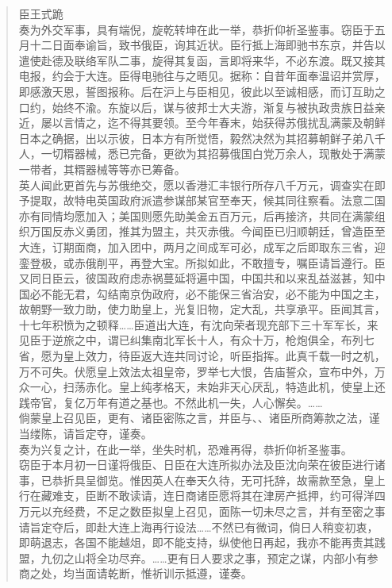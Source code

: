 \begin{quote}
	臣王式跪\\

奏为外交军事，具有端倪，旋乾转坤在此一举，恭折仰祈圣鉴事。窃臣于五月十二日面奉谕旨，致书俄臣，询其近状。臣行抵上海即驰书东京，并告以遣使赴德及联络军队二事，旋得其复函，言即将来华，不必东渡。既又接其电报，约会于大连。臣得电驰往与之晤见。据称：自昔年面奉温诏并赏厚，即感激天恩，誓图报称。后在沪上与臣相见，彼此以至诚相感，而订互助之口约，始终不渝。东旋以后，谋与彼邦士大夫游，渐复与被执政贵族日益亲近，屡以言情之，迄不得其要领。至今年春末，始获得苏俄扰乱满蒙及朝鲜日本之确据，出以示彼，日本方有所觉悟，毅然决然为其招募朝鲜子弟八千人，一切糈器械，悉已完备，更欲为其招募俄国白党万余人，现散处于满蒙一带者，其糈器械等等亦已筹备。\\

英人闻此更首先与苏俄绝交，愿以香港汇丰银行所存八千万元，调查实在即予提取，故特电英国政府派遣参谋部某官至奉天，候其同往察看。法意二国亦有同情均愿加入；美国则愿先助美金五百万元，后再接济，共同在满蒙组织万国反赤义勇团，推其为盟主，共灭赤俄。今闻臣已归顺朝廷，曾造臣至大连，订期面商，加入团中，两月之间成军可必，成军之后即取东三省，迎銮登极，或赤俄削平，再登大宝。所拟如此，不敢擅专，嘱臣请旨遵行。臣又同日臣云，彼国政府虑赤祸蔓延将遍中国，中国共和以来乱益滋甚，知中国必不能无君，勾结南京伪政府，必不能保三省治安，必不能为中国之主，故朝野一致力助，使力助皇上，光复旧物，定大乱，共享承平。臣闻其言，十七年积愤为之顿释……臣道出大连，有沈向荣者现充部下三十军军长，来见臣于逆旅之中，谓已纠集南北军长十人，有众十万，枪炮俱全，布列七省，愿为皇上效力，待臣返大连共同讨论，听臣指挥。此真千载一时之机，万不可失。伏愿皇上效法太祖皇帝，罗举七大恨，告庙誓众，宣布中外，万众一心，扫荡赤化。皇上纯孝格天，未始非天心厌乱，特造此机，使皇上还践帝官，复亿万年有道之基也。不然此机一失，人心懈矣。……\\

倘蒙皇上召见臣，更有、诸臣密陈之言，并臣与、、诸臣所商筹款之法，谨当缕陈，请旨定夺，谨奏。\\

奏为兴复之计，在此一举，坐失时机，恐难再得，恭折仰祈圣鉴事。\\

窃臣于本月初一日谨将俄臣、日臣在大连所拟办法及臣沈向荣在彼臣进行诸事，已恭折具呈御览。惟因英人在奉天久待，无可托辞，故需款至急，皇上行在藏难支，臣断不敢读请，连日商诸臣愿将其在津房产抵押，约可得洋四万元以充经费，不足之数臣拟皇上召见，面陈一切未尽之言，并有至密之事请旨定夺后，即赴大连上海再行设法……不然已有微词，倘日人稍变初衷，即萌退志，各国不能越俎，即不能支持，纵使他日再起，我亦不能再责其践盟，九仞之山将全功尽弃。……更有日人要求之事，预定之谋，内部小有参商之处，均当面请乾断，惟祈训示抵遵，谨奏。\\


\end{quote}
